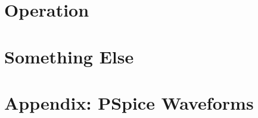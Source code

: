 \documentclass[12pt,a4paper,titlepage]{article}
\begin{document}
\section{Operation}

\section{Something Else}

\newpage

\appendix

\section{Appendix: PSpice Waveforms}

\newpage
\printbibliography
\end{document}
